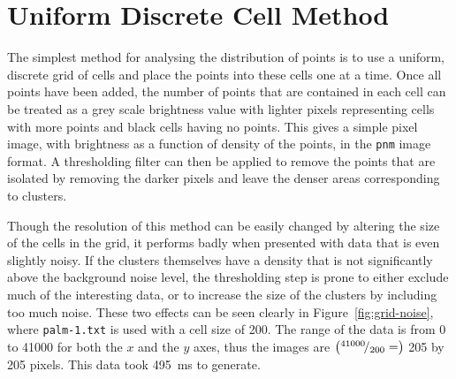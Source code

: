 
\section{Uniform Discrete Cell Method}
\label{sec:simple_grid_method}

The simplest method for analysing the distribution of points is to use a
uniform, discrete grid of cells and place the points into these cells one at a
time. Once all points have been added, the number of points that are contained
in each cell can be treated as a grey scale brightness value with lighter
pixels representing cells with more points and black cells having no points.
This gives a simple pixel image, with brightness as a function of density of
the points, in the \texttt{pnm} image format\cite{murray1996encyclopedia}. A
thresholding filter can then be applied to remove the points that are isolated
by removing the darker pixels and leave the denser areas corresponding to
clusters.

Though the resolution of this method can be easily changed by altering the size
of the cells in the grid, it performs badly when presented with data that is
even slightly noisy. If the clusters themselves have a density that is not
significantly above the background noise level, the thresholding step is prone
to either exclude much of the interesting data, or to increase the size of the
clusters by including too much noise. These two effects can be seen clearly in
Figure~\ref{fig:grid-noise}, where \texttt{palm-1.txt} is used with a cell size
of 200. The range of the data is from 0 to \num{41000} for both the $x$ and the
$y$ axes, thus the images are $\left({}^{41000}\!/_{200} = \right)$ 205 by 205
pixels. This data took \SI{495}{\milli\second} to generate.

